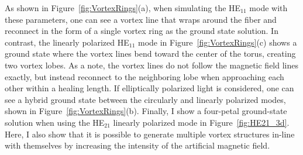 As shown in Figure~\ref{fig:VortexRings}(a), when simulating the HE$_{11}$ mode with these parameters, one can see a vortex line that wraps around the fiber and reconnect in the form of a single vortex ring as the ground state solution.
In contrast, the linearly polarized HE$_{11}$ mode in Figure~\ref{fig:VortexRings}(c) shows a ground state where the vortex lines bend toward the center of the torus, creating two vortex lobes.
As a note, the vortex lines do not follow the magnetic field lines exactly, but instead reconnect to the neighboring lobe when approaching each other within a healing length.
If elliptically polarized light is considered, one can see a hybrid ground state between the circularly and linearly polarized modes, shown in Figure~\ref{fig:VortexRings}(b).
Finally, I show a four-petal ground-state solution when using the HE$_{21}$ linearly polarized mode in Figure~\ref{fig:HE21_3d}.
Here, I also show that it is possible to generate multiple vortex structures in-line with themselves by increasing the intensity of the artificial magnetic field.

